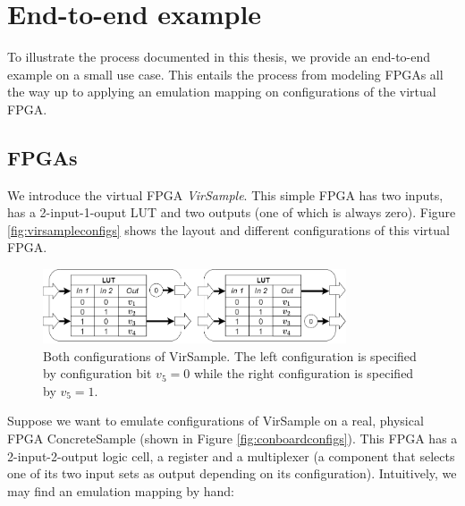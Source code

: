 \chapter{End-to-end example}
To illustrate the process documented in this thesis, we provide an end-to-end example on a small use case. This entails the process from modeling FPGAs all the way up to applying an emulation mapping on configurations of the virtual FPGA.

\section{FPGAs}
We introduce the virtual FPGA \textit{VirSample}. This simple FPGA has two inputs, has a 2-input-1-ouput LUT and two outputs (one of which is always zero). Figure \ref{fig:virsampleconfigs} shows the layout and different configurations of this virtual FPGA.

\begin{figure}
\centering
\includegraphics[width=0.8\textwidth]{images/endToEnd/exampleFPGA.png}
\caption{Both configurations of VirSample. The left configuration is specified by configuration bit $v_5=0$ while the right configuration is specified by $v_5=1$.}
\label{fig:visampleconfigs}
\end{figure}

Suppose we want to emulate configurations of VirSample on a real, physical FPGA ConcreteSample (shown in Figure \ref{fig:conboardconfigs}). This FPGA has a 2-input-2-output logic cell, a register and a multiplexer (a component that selects one of its two input sets as output depending on its configuration). Intuitively, we may find an emulation mapping by hand:

